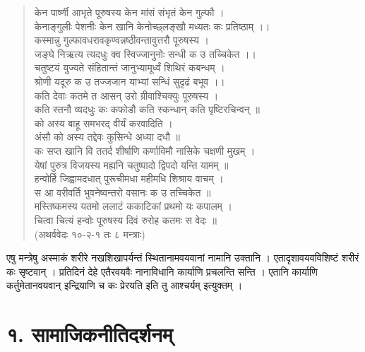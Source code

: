 \begin{verse}
केन पार्ष्णी आभृते पूरुषस्य केन मांसं संभृतं केन गुल्फौ ।\\
केनाङ्गुलीः पेशनीः केन खानि केनोच्छ्लङ्खौ मध्यतः कः प्रतिष्ठाम् ।।\\
कस्मान्नु गुल्फावधरावकृण्वन्नष्ठीवन्तावुत्तरौ पूरुषस्य ।\\
जङ्घे निऋत्य त्यदधुः क्व स्विज्जानुनोः सन्धी क उ तच्चिकेत ।।\\
चतुष्टयं युज्यते संहितान्तं जानुभ्यामूर्ध्वं शिथिरं कबन्धम् ।\\
श्रोणी यदूरु क उ तज्जजान याभ्यां सन्धिं सुदृढं बभूव ।।\\
कति देवाः कतमे त आसन् उरो ग्रीवाश्चिक्युः पूरुषस्य ।\\
कति स्तनौ व्यदधुः कः कफोडौ कति स्कन्धान् कति पृष्टिरचिन्वन् ॥\\
को अस्य बाहू समभरद् वीर्यं करवादिति ।\\
अंसौ को अस्य तद्देवः कुसिन्धे अध्या दधौ ॥\\
कः सप्त खानि वि ततर्द शीर्षाणि कर्णाविमौ नासिके चक्षणी मुखम् ।\\
येषां पुरुत्र विजयस्य मह्यनि चतुष्पादो द्विपदो यन्ति यामम् ॥\\
हन्वोर्हि जिह्वामदधात् पुरूचीमधा महीमधि शिश्राय वाचम् ।\\
स आ वरीवर्ति भुवनेष्वन्तरो वसानः क उ तच्चिकेत ॥\\
मस्तिष्कमस्य यतमो ललाटं ककाटिकां प्रथमो यः कपालम् ।\\
चित्वा चित्यं हन्वोः पूरुषस्य दिवं रुरोह कतमः स वेदः ॥\\
\hfill (अथर्ववेदः १०-२-१ तः ८ मन्त्राः)
\end{verse}
एषु मन्त्रेषु अस्माकं शरीरे नखशिखापर्यन्तं स्थितानामवयवानां नामानि उक्तानि । एतादृशावयवविशिष्टं शरीरं कः सृष्टवान् । प्रतिदिनं देहे एतैरवयवैः नानाविधानि कार्याणि प्रचलन्ति सन्ति । एतानि कार्याणि कर्तुमेतानवयवान् इन्द्रियाणि च कः प्रेरयति इति तु आश्चर्यम् इत्युक्तम् ।

\section*{१. सामाजिकनीतिदर्शनम्}

